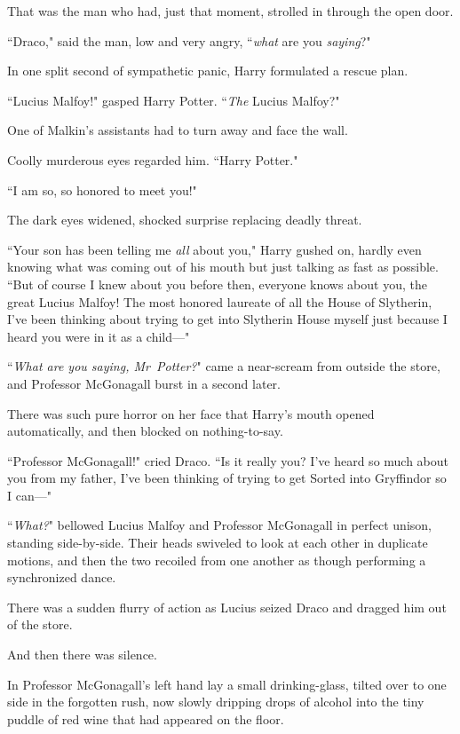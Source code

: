 That was the man who had, just that moment, strolled in through the open door.

``Draco," said the man, low and very angry, ``\emph{what} are you \emph{saying}?"

In one split second of sympathetic panic, Harry formulated a rescue plan.

``Lucius Malfoy!" gasped Harry Potter. ``\emph{The} Lucius Malfoy?"

One of Malkin's assistants had to turn away and face the wall.

Coolly murderous eyes regarded him. ``Harry Potter."

``I am so, so honored to meet you!"

The dark eyes widened, shocked surprise replacing deadly threat.

``Your son has been telling me \emph{all} about you," Harry gushed on, hardly even knowing what was coming out of his mouth but just talking as fast as possible. ``But of course I knew about you before then, everyone knows about you, the great Lucius Malfoy! The most honored laureate of all the House of Slytherin, I've been thinking about trying to get into Slytherin House myself just because I heard you were in it as a child—"

``\emph{What are you saying, Mr~Potter?}" came a near-scream from outside the store, and Professor McGonagall burst in a second later.

There was such pure horror on her face that Harry's mouth opened automatically, and then blocked on nothing-to-say.

``Professor McGonagall!" cried Draco. ``Is it really you? I've heard so much about you from my father, I've been thinking of trying to get Sorted into Gryffindor so I can—"

``\emph{What?}" bellowed Lucius Malfoy and Professor McGonagall in perfect unison, standing side-by-side. Their heads swiveled to look at each other in duplicate motions, and then the two recoiled from one another as though performing a synchronized dance.

There was a sudden flurry of action as Lucius seized Draco and dragged him out of the store.

And then there was silence.

In Professor McGonagall's left hand lay a small drinking-glass, tilted over to one side in the forgotten rush, now slowly dripping drops of alcohol into the tiny puddle of red wine that had appeared on the floor.

